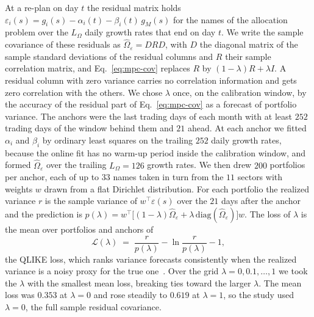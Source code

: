 At a re-plan on day $t$ the residual matrix holds $\varepsilon_i(s) = g_i(s) - \alpha_i(t) - \beta_i(t)\,g_M(s)$
for the names of the allocation problem over the $L_\Omega$ daily growth rates that end on day $t$. We write the sample covariance of these residuals as
$\hat\Omega_\varepsilon = D R D$, with $D$ the diagonal matrix of the sample standard deviations of the residual
columns and $R$ their sample correlation matrix, and Eq.~\eqref{eq:mpc-cov} replaces $R$ by $(1-\lambda)R +
\lambda I$. A residual column with zero variance carries no correlation information and gets zero correlation with
the others. We chose $\lambda$ once, on the calibration window, by the accuracy of the residual part of
Eq.~\eqref{eq:mpc-cov} as a forecast of portfolio variance. The anchors were the last trading days of each month
with at least $252$ trading days of the window behind them and $21$ ahead. At each anchor we fitted $\alpha_i$
and $\beta_i$ by ordinary least squares on the trailing $252$ daily growth rates, because the online fit has no
warm-up period inside the calibration window, and formed $\hat\Omega_\varepsilon$ over the trailing
$L_\Omega = 126$ growth rates. We then drew $200$ portfolios per anchor, each of up to $33$ names taken in turn
from the $11$ sectors with weights $w$ drawn from a flat Dirichlet distribution. For each portfolio the realized
variance $r$ is the sample variance of $w^{\top}\varepsilon(s)$ over the $21$ days after the anchor and the
prediction is $p(\lambda) = w^{\top}\big[(1-\lambda)\hat\Omega_\varepsilon +
\lambda\,\mathrm{diag}(\hat\Omega_\varepsilon)\big]w$. The loss of $\lambda$ is the mean over portfolios and
anchors of
\begin{equation}
  \mathcal{L}(\lambda) \;=\; \frac{r}{p(\lambda)} - \ln\frac{r}{p(\lambda)} - 1,
  \label{eq:qlike}
\end{equation}
the QLIKE loss, which ranks variance forecasts consistently when the realized variance is a noisy proxy for the
true one~\cite{patton2011}. Over the grid $\lambda = 0, 0.1, \dots, 1$ we took the $\lambda$ with the smallest mean
loss, breaking ties toward the larger $\lambda$.
The mean loss was $0.353$ at $\lambda = 0$ and rose steadily to $0.619$ at $\lambda = 1$, so the study used
$\lambda = 0$, the full sample residual covariance.


